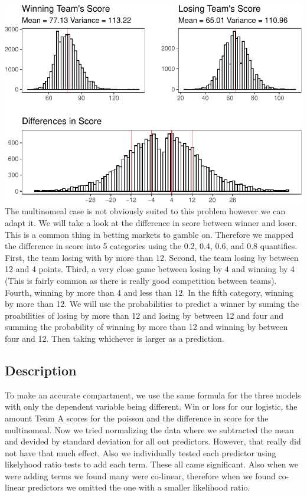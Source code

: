 \documentclass[
  man,floatsintext]{apa6}
\begin{document}
\includegraphics{paper_files/figure-latex/unnamed-chunk-3-1.pdf}
The multinomeal case is not obviously suited to this problem however we can adapt it. We will take a look at the difference in score between winner and loser. This is a common thing in betting markets to gamble on. Therefore we mapped the difference in score into 5 categories using the 0.2, 0.4, 0.6, and 0.8 quantifies. First, the team losing with by more than 12. Second, the team losing by between 12 and 4 points. Third, a very close game between losing by 4 and winning by 4 (This is fairly common as there is really good competition between teams). Fourth, winning by more than 4 and less than 12. In the fifth category, winning by more than 12. We will use the probabilities to predict a winner by suming the proabilities of losing by more than 12 and losing by between 12 and four and summing the probability of winning by more than 12 and winning by between four and 12. Then taking whichever is larger as a prediction.

\hypertarget{description}{%
\subsection{Description}\label{description}}

To make an accurate compartment, we use the same formula for the three models with only the dependent variable being different. Win or loss for our logistic, the amount Team A scores for the poisson and the difference in score for the multinomeal. Now we tried normalizing the data where we subtracted the mean and devided by standard deviation for all out predictors. However, that really did not have that much effect. Also we individually tested each predictor using likelyhood ratio tests to add each term. These all came significant. Also when we were adding terms we found many were co-linear, therefore when we found co-linear predictors we omitted the one with a smaller likelihood ratio.
\end{document}
